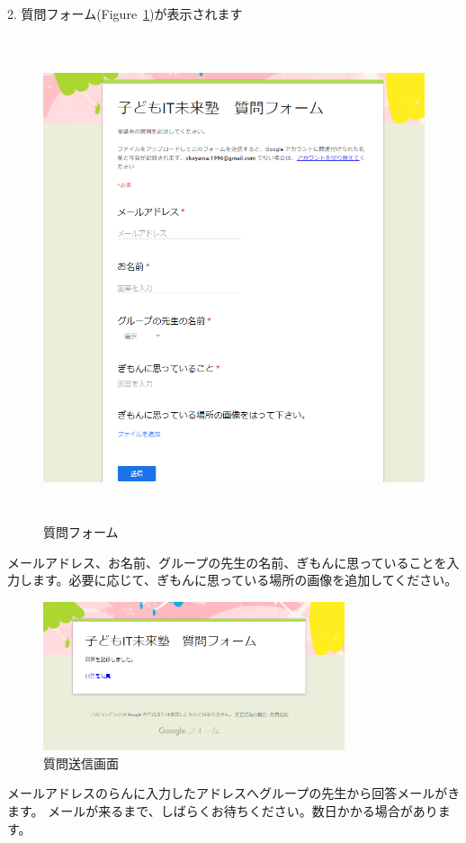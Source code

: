 2.
質問フォーム(Figure~\ref{fig:prog_menu})が表示されます
\begin{figure}[H]
    \begin{center}
      \includegraphics[width=13.263cm,height=14.233cm]{text04-img/textbook-img246.png}
      \caption{質問フォーム}
    \end{center}
    \label{fig:prog_menu}
\end{figure}

メールアドレス、お名前、グループの先生の名前、ぎもんに思っていることを入力します。必要に応じて、ぎもんに思っている場所の画像を追加してください。

\begin{description}
    \item {}
\end{description}


\begin{figure}[H]
    \begin{center}
      \includegraphics[width=8.871cm,height=4.374cm]{text04-img/textbook-img247.png}
      \caption{質問送信画面}
    \end{center}
    \label{fig:prog_menu2}
\end{figure}

メールアドレスのらんに入力したアドレスへグループの先生から回答メールがきます。
メールが来るまで、しばらくお待ちください。数日かかる場合があります。





